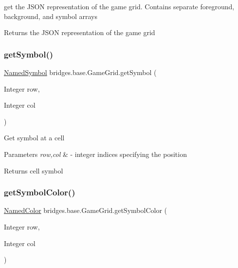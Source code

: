get the J\+S\+ON representation of the game grid. Contains separate foreground, background, and symbol arrays

\begin{DoxyReturn}{Returns}
the J\+S\+ON representation of the game grid 
\end{DoxyReturn}
\mbox{\label{classbridges_1_1base_1_1_game_grid_a974e33d5561a8f214966be626a9ca8ca}} 
\subsubsection{\texorpdfstring{get\+Symbol()}{getSymbol()}}
{\footnotesize\ttfamily \hyperlink{enumbridges_1_1base_1_1_named_symbol}{Named\+Symbol} bridges.\+base.\+Game\+Grid.\+get\+Symbol (\begin{DoxyParamCaption}\item[{Integer}]{row,  }\item[{Integer}]{col }\end{DoxyParamCaption})}

Get symbol at a cell


\begin{DoxyParams}{Parameters}
{\em row,col} & -\/ integer indices specifying the position\\
\hline
\end{DoxyParams}
\begin{DoxyReturn}{Returns}
cell symbol 
\end{DoxyReturn}
\mbox{\label{classbridges_1_1base_1_1_game_grid_ab094ebfd585aac9440836ad6875ce094}} 
\subsubsection{\texorpdfstring{get\+Symbol\+Color()}{getSymbolColor()}}
{\footnotesize\ttfamily \hyperlink{enumbridges_1_1base_1_1_named_color}{Named\+Color} bridges.\+base.\+Game\+Grid.\+get\+Symbol\+Color (\begin{DoxyParamCaption}\item[{Integer}]{row,  }\item[{Integer}]{col }\end{DoxyParamCaption})}

